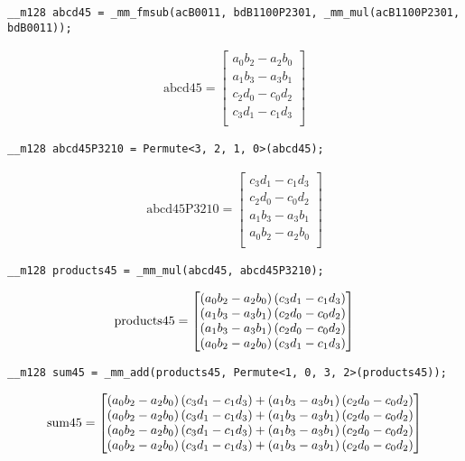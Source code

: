 \begin{verbatim}
__m128 abcd45 = _mm_fmsub(acB0011, bdB1100P2301, _mm_mul(acB1100P2301, bdB0011));
\end{verbatim}

\begin{align*}
\mathrm{abcd45} 
=
\begin{bmatrix}
a_0b_2 - a_2b_0\\
a_1b_3 - a_3b_1\\
c_2d_0 - c_0d_2\\
c_3d_1 - c_1d_3\\
\end{bmatrix}
\end{align*}

\begin{verbatim}
__m128 abcd45P3210 = Permute<3, 2, 1, 0>(abcd45);
\end{verbatim}

\begin{align*}
\mathrm{abcd45P3210} 
=
\begin{bmatrix}
c_3d_1 - c_1d_3\\
c_2d_0 - c_0d_2\\
a_1b_3 - a_3b_1\\
a_0b_2 - a_2b_0\\
\end{bmatrix}
\end{align*}

\begin{verbatim}
__m128 products45 = _mm_mul(abcd45, abcd45P3210);
\end{verbatim}

\begin{align*}
\mathrm{products45} 
=
\begin{bmatrix}
\left(a_0b_2 - a_2b_0\right)\left(c_3d_1 - c_1d_3\right)\\
\left(a_1b_3 - a_3b_1\right)\left(c_2d_0 - c_0d_2\right)\\
\left(a_1b_3 - a_3b_1\right)\left(c_2d_0 - c_0d_2\right)\\
\left(a_0b_2 - a_2b_0\right)\left(c_3d_1 - c_1d_3\right)\\
\end{bmatrix}
\end{align*}


\begin{verbatim}
__m128 sum45 = _mm_add(products45, Permute<1, 0, 3, 2>(products45));
\end{verbatim}



\begin{align*}
\mathrm{sum45} 
=
\begin{bmatrix}
  \left(a_0b_2 - a_2b_0\right)\left(c_3d_1 - c_1d_3\right)
+ \left(a_1b_3 - a_3b_1\right)\left(c_2d_0 - c_0d_2\right)\\
  \left(a_0b_2 - a_2b_0\right)\left(c_3d_1 - c_1d_3\right)
+ \left(a_1b_3 - a_3b_1\right)\left(c_2d_0 - c_0d_2\right)\\
  \left(a_0b_2 - a_2b_0\right)\left(c_3d_1 - c_1d_3\right)
+ \left(a_1b_3 - a_3b_1\right)\left(c_2d_0 - c_0d_2\right)\\
  \left(a_0b_2 - a_2b_0\right)\left(c_3d_1 - c_1d_3\right)
+ \left(a_1b_3 - a_3b_1\right)\left(c_2d_0 - c_0d_2\right)\\
\end{bmatrix}
\end{align*}

